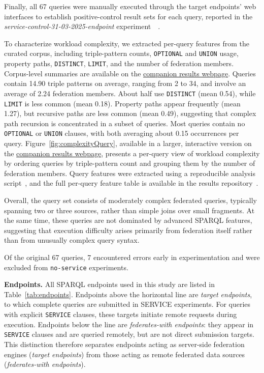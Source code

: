 \documentclass[runningheads]{llncs}
\begin{document}
Finally, all 67 queries were manually executed through the target endpoints' web interfaces to establish positive-control result sets for each query, reported in the \textit{service-control-31-03-2025-endpoint} experiment~~\cite{fedSurveyResultsRepo}.

To characterize workload complexity, we extracted per-query features from the curated corpus, including triple-pattern counts, \texttt{OPTIONAL} and \texttt{UNION} usage, property paths, \texttt{DISTINCT}, \texttt{LIMIT}, and the number of federation members. 
Corpus-level summaries are available on the \href{https://ecrum19.github.io/fed-survey-results/}{companion results webpage}. 
Queries contain 14.90 triple patterns on average, ranging from 2 to 34, and involve an average of 2.24 federation members. 
About half use \texttt{DISTINCT} (mean 0.54), while \texttt{LIMIT} is less common (mean 0.18). 
Property paths appear frequently (mean 1.27), but recursive paths are less common (mean 0.49), suggesting that complex path recursion is concentrated in a subset of queries. 
Most queries contain no \texttt{OPTIONAL} or \texttt{UNION} clauses, with both averaging about 0.15 occurrences per query.
Figure~\ref{fig:complexityQuery}, available in a larger, interactive version on the \href{https://ecrum19.github.io/fed-survey-results/}{companion results webpage}, presents a per-query view of workload complexity by ordering queries by triple-pattern count and grouping them by the number of federation members.
Query features were extracted using a reproducible analysis script~\cite{queryAnalysisSibFederatedRepo}, and the full per-query feature table is available in the results repository~\cite{fedSurveyResultsRepo}.

Overall, the query set consists of moderately complex federated queries, typically spanning two or three sources, rather than simple joins over small fragments. 
At the same time, these queries are not dominated by advanced SPARQL features, suggesting that execution difficulty arises primarily from federation itself rather than from unusually complex query syntax.



Of the original 67 queries, 7 encountered errors early in experimentation and were excluded from \texttt{no-service} experiments.



\textbf{Endpoints.}
All SPARQL endpoints used in this study are listed in Table~\ref{tab:endpoints}. 
Endpoints above the horizontal line are \textit{target endpoints}, to which complete queries are submitted in \textsc{SERVICE} experiments. 
For queries with explicit \texttt{SERVICE} clauses, these targets initiate remote requests during execution. 
Endpoints below the line are \textit{federates-with endpoints}: they appear in \texttt{SERVICE} clauses and are queried remotely, but are not direct submission targets. 
This distinction therefore separates endpoints acting as server-side federation engines (\textit{target endpoints}) from those acting as remote federated data sources (\textit{federates-with endpoints}).
\end{document}
